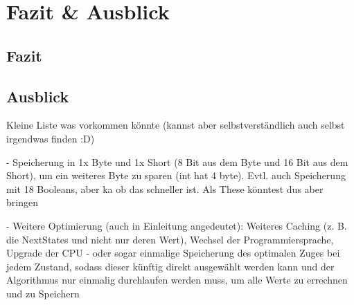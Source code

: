 \chapter{Fazit \& Ausblick}

\section{Fazit}

\section{Ausblick}
Kleine Liste was vorkommen könnte (kannst aber selbstverständlich auch selbst irgendwas finden :D) 

- Speicherung in 1x Byte und 1x Short (8 Bit aus dem Byte und 16 Bit aus dem Short), um ein weiteres Byte zu sparen (int hat 4 byte). Evtl. auch
Speicherung mit 18 Booleans, aber ka ob das schneller ist. Als These könntest dus aber bringen

- Weitere Optimierung (auch in Einleitung angedeutet): Weiteres Caching (z. B. die NextStates und nicht nur deren Wert), Wechsel der Programmiersprache, Upgrade der CPU - 
oder sogar einmalige Speicherung des optimalen Zuges bei jedem Zustand, sodass dieser künftig direkt ausgewählt werden kann und der Algorithmus nur einmalig
durchlaufen werden muss, um alle Werte zu errechnen und zu Speichern